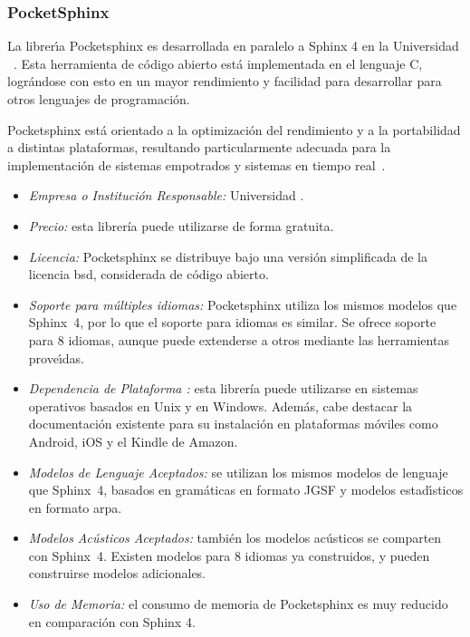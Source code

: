 \subsubsection{PocketSphinx}
\label{sec:pocketsphinx}

La librer{\'\i}a Pocketsphinx es desarrollada en paralelo a Sphinx 4 en la Universidad
\mbox{ \cite{PocketSphinxHomePage}}. Esta herramienta de c\'odigo abierto
est\'a implementada en el lenguaje C, logr\'andose con esto en un mayor rendimiento y facilidad
para desarrollar  para otros lenguajes de programaci\'on.

Pocketsphinx est\'a orientado a la optimizaci\'on del rendimiento y a la portabilidad a distintas
plataformas, resultando particularmente adecuada para la implementaci\'on de sistemas empotrados
y sistemas en tiempo \mbox{real \cite{HugginsDainesPocketSphinx2006}}.

\begin{itemize}
	\item \emph{Empresa o Instituci\'on Responsable:} Universidad .
	\item \emph{Precio:} esta librer\'ia puede utilizarse de forma gratuita.
	\item \emph{Licencia:} Pocketsphinx  se distribuye bajo una versi\'on simplificada de la licencia
	\gls{bsd}, considerada de c\'odigo abierto.
	\item \emph{Soporte para m\'ultiples idiomas:} Pocketsphinx utiliza los mismos modelos
	que \mbox{Sphinx 4}, por lo que el soporte para idiomas es similar. Se ofrece soporte para 8
	idiomas, aunque puede extenderse a otros mediante las herramientas prove{\'\i}das.
	\item \emph{Dependencia de Plataforma :} esta librer\'ia puede utilizarse en sistemas operativos
	basados en Unix y en Windows. Adem\'as, cabe destacar la documentaci\'on existente para su instalaci\'on
	en plataformas m\'oviles como Android, iOS y el Kindle de Amazon.
	\item \emph{Modelos de Lenguaje Aceptados:} se utilizan los mismos modelos de lenguaje que \mbox{Sphinx 4},
	basados en gram\'aticas en formato JGSF y modelos estad{\'\i}sticos en formato \gls{arpa}.
	\item \emph{Modelos Ac\'usticos Aceptados:} tambi\'en los modelos ac\'usticos se comparten con \mbox{Sphinx 4}.
	Existen modelos para 8 idiomas ya construidos, y pueden construirse modelos adicionales.
	\item \emph{Uso de Memoria:} el consumo de memoria de Pocketsphinx es muy reducido en comparaci\'on con
        Sphinx 4\cite{SphinxVersions}.
\end{itemize}